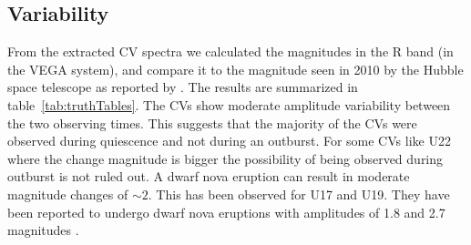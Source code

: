 \subsection{Variability}

From the extracted CV spectra we calculated the magnitudes in the R band (in the VEGA system), and compare it to the magnitude seen in 2010 by the Hubble space telescope as reported by \cite{cohn_identification_2010}. The results are summarized in table~\ref{tab:truthTables}. The CVs show moderate amplitude variability between the two observing times. This suggests that the majority of the CVs were observed during quiescence and not during an outburst. For some CVs like U22 where the change magnitude is bigger the possibility of being observed during outburst is not ruled out. A dwarf nova eruption can result in moderate magnitude changes of $\sim 2$. This has been observed for U17 and U19. They have been reported to undergo dwarf nova eruptions with amplitudes of 1.8 and 2.7 magnitudes \citep{shara_erupting_2005}. 

